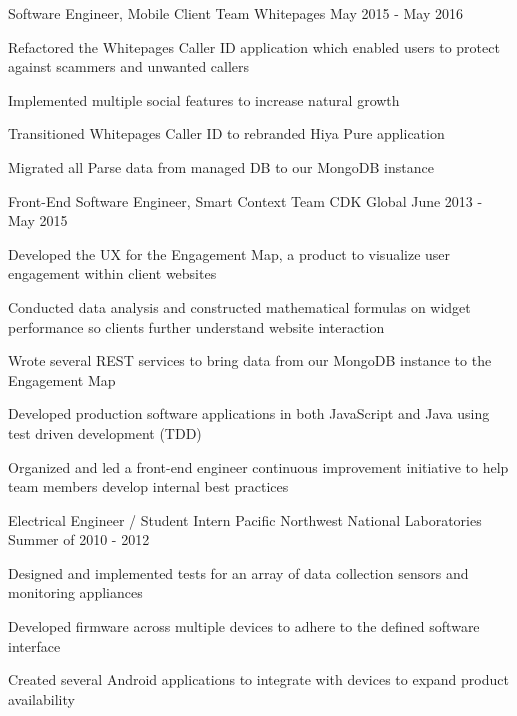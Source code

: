 \begin{cventries}
  \cventry
    {Software Engineer, Mobile Client Team} %
    {Whitepages} %
    {} %
    {May 2015 - May 2016} %
    {
	\begin{cvitems} %
    \item Refactored the Whitepages Caller ID application which enabled users to protect against scammers and unwanted callers
    \item Implemented multiple social features to increase natural growth
    \item Transitioned Whitepages Caller ID to rebranded Hiya Pure application
    \item Migrated all Parse data from managed DB to our MongoDB instance
	\end{cvitems}
    }

  \cventry
    {Front-End Software Engineer, Smart Context Team} %
    {CDK Global} %
    {} %
    {June 2013 - May 2015} %
    {
	\begin{cvitems} %
    \item Developed the UX for the Engagement Map, a product to visualize user engagement within client websites
    \item Conducted data analysis and constructed mathematical formulas on widget performance so clients further understand website interaction
    \item Wrote several REST services to bring data from our MongoDB instance to the Engagement Map
    \item Developed production software applications in both JavaScript and Java using test driven development (TDD)
    \item Organized and led a front-end engineer continuous improvement initiative to help team members develop internal best practices
	\end{cvitems}
    }
    
  \cventry
    {Electrical Engineer / Student Intern} %
    {Pacific Northwest National Laboratories} %
    {} %
    {Summer of 2010 - 2012} %
    {
	\begin{cvitems} %
    \item Designed and implemented tests for an array of data collection sensors and monitoring appliances
    \item Developed firmware across multiple devices to adhere to the defined software interface
    \item Created several Android applications to integrate with devices to expand product availability
	\end{cvitems}
    }


\end{cventries}
